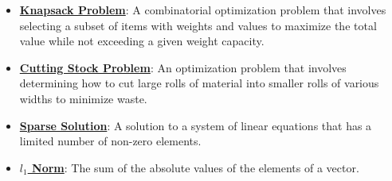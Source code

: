 \documentclass{article}%
\begin{document}
\begin{itemize}[leftmargin=*]
\item \href{https://www.math.purdue.edu/~yipn/421/2024-10-28-ApplsLinProg.pdf#page=24}{\textbf{Knapsack Problem}}: A combinatorial optimization problem that involves selecting a subset of items with weights and values to maximize the total value while not exceeding a given weight capacity.%
\item \href{https://www.math.purdue.edu/~yipn/421/2024-10-28-ApplsLinProg.pdf#page=25}{\textbf{Cutting Stock Problem}}: An optimization problem that involves determining how to cut large rolls of material into smaller rolls of various widths to minimize waste.%
\item \href{https://www.math.purdue.edu/~yipn/421/2024-10-28-ApplsLinProg.pdf#page=30}{\textbf{Sparse Solution}}: A solution to a system of linear equations that has a limited number of non-zero elements.%
\item \href{https://www.math.purdue.edu/~yipn/421/2024-10-28-ApplsLinProg.pdf#page=34}{\textbf{$l_1$ Norm}}: The sum of the absolute values of the elements of a vector.%
\end{itemize}

%
\end{document}
